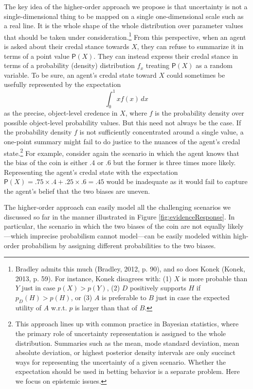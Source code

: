 \documentclass[
  10pt,
  dvipsnames,enabledeprecatedfontcommands]{scrartcl}
\begin{document}
The key idea of the higher-order approach we propose is that uncertainty
is not a single-dimensional thing to be mapped on a single
one-dimensional scale such as a real line. It is the whole shape of the
whole distribution over parameter values that should be taken under
consideration.\footnote{Bradley admits this much (Bradley, 2012, p. 90),
  and so does Konek (Konek, 2013, p. 59). For instance, Konek disagrees
  with: (1) \(X\) is more probable than \(Y\) just in case
  \(p(X)>p(Y)\), (2) \(D\) positively supports \(H\) if
  \(p_D(H)> p(H)\), or (3) \(A\) is preferable to \(B\) just in case the
  expected utility of \(A\) w.r.t. \(p\) is larger than that of \(B\).}
From this perspective, when an agent is asked about their credal stance
towards \(X\), they can refuse to summarize it in terms of a point value
\(\mathsf{P}(X)\). They can instead express their credal stance in terms
of a probability (density) distribution \(f_x\) treating
\(\mathsf{P}(X)\) as a random variable. To be sure, an agent's credal
state toward \(X\) could sometimes be usefully represented by the
expectation\\
\[\int_{0}^{1} x f(x) \, dx\] as the precise, object-level credence in
\(X\), where \(f\) is the probability density over possible object-level
probability values. But this need not always be the case. If the
probability density \(f\) is not sufficiently concentrated around a
single value, a one-point summary might fail to do justice to the
nuances of the agent's credal state.\footnote{This approach lines up
  with common practice in Bayesian statistics, where the primary role of
  uncertainty representation is assigned to the whole distribution.
  Summaries such as the mean, mode standard deviation, mean absolute
  deviation, or highest posterior density intervals are only succinct
  ways for representing the uncertainty of a given scenario. Whether the
  expectation should be used in betting behavior is a separate problem.
  Here we focus on epistemic issues.} For example, consider again the
scenario in which the agent knows that the bias of the coin is either .4
or .6 but the former is three times more likely. Representing the
agent's credal state with the expectation
\(\mathsf{P}(X) = .75 \times .4 + .25 \times .6 = .45\) would be
inadequate as it would fail to capture the agent's belief that the two
biases are uneven.

The higher-order approach can easily model all the challenging scenarios
we discussed so far in the manner illustrated in Figure
\ref{fig:evidenceResponse}. In particular, the scenario in which the two
biases of the coin are not equally likely---which imprecise probabilism
cannot model---can be easily modeled within high-order probabilism by
assigning different probabilities to the two biases.
\end{document}
